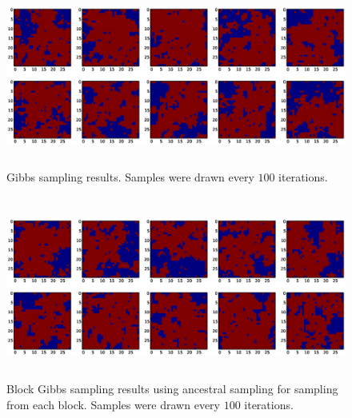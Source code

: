 \documentclass[a4paper]{article}
\begin{document}
\begin{figure}
    \begin{center}
        \includegraphics[width=15cm,height=6cm]{samples.eps}
        \caption{Gibbs sampling results. Samples were drawn every $100$ iterations.}
        \label{fig:gibbs}
    \end{center}
\end{figure}

\begin{figure}
    \begin{center}
        \includegraphics[width=15cm,height=6cm]{sample_block.eps}
        \caption{Block Gibbs sampling results using ancestral sampling for sampling from each block. 
        Samples were drawn every $100$ iterations.}
        \label{fig:block_gibbs}
    \end{center}
\end{figure}
\end{document}
